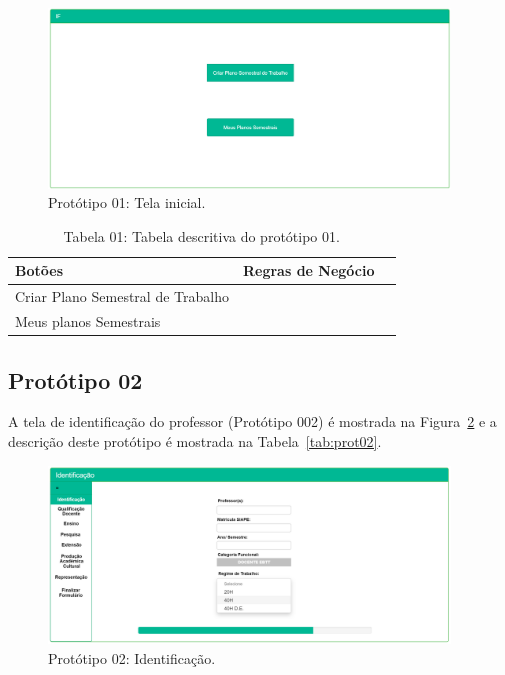 \begin{figure}[H]
    \centering
    \includegraphics[width=0.95\textwidth]{img/1pagina_inicial.png}
    \caption[Protótipo 01: Tela inicial]{Protótipo 01: Tela inicial.}
    \label{fig:prot01}
\end{figure}

\begin{table}[H]
\centering
\caption[Tabela 01: Tabela descritiva do protótipo 01.]{Tabela 01: Tabela descritiva do protótipo 01.}
\label{tab:prot01}
\begin{tabular}{@{}lll@{}}
\toprule
Botões                &  Regras de Negócio                                \\ \midrule
Criar Plano Semestral de Trabalho      &     \nameref{rn016}              \\
Meus planos Semestrais                 &      \nameref{rn017}              \\ \bottomrule
\end{tabular}
\end{table}

\newpage
\subsection{Protótipo 02}\label{prototipo02}
A tela de identificação do professor (Protótipo 002) é mostrada na Figura~\ref{fig:prot02} e a descrição deste protótipo é mostrada na Tabela~\ref{tab:prot02}.


\begin{figure}[H]
    \centering
    \includegraphics[width=0.95\textwidth]{img/2pagina_de_identificacao.png}
    \caption[Protótipo 02: Identificação]{Protótipo 02: Identificação.}
    \label{fig:prot02}
\end{figure}


